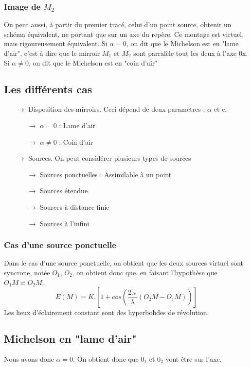 \subsubsection{Image de $M_2$}
On peut aussi, à partir du premier tracé, celui d'un point source, obtenir un schéma équivalent, ne portant que sur un axe du repère. Ce montage est virtuel, mais rigoureusement équivalent. Si $\alpha = 0$, on dit que le Michelson est en "lame d'air", c'est à dire que le mirroir $M_1$ et $M_2$ sont parralèle tout les deux à l'axe 0x. Si $\alpha \neq 0$, on dit que le Michelson est en "coin d'air"
\subsection{Les différents cas}
\begin{itemize}
 \item[$\rightarrow$] Disposition des mirroirs. Ceci dépend de deux paramètres : $\alpha$ et e.
\begin{itemize}
 \item[$\rightarrow$] $\alpha = 0$ : Lame d'air
 \item[$\rightarrow$] $\alpha \neq 0$ : Coin d'air
\end{itemize}
 \item[$\rightarrow$] Sources. On peut considérer plusieurs types de sources
\begin{itemize}
 \item[$\rightarrow$] Sources ponctuelles : Assimilable à un point
 \item[$\rightarrow$] Sources étendue
 \item[$\rightarrow$] Sources à distance finie
 \item[$\rightarrow$] Sources à l'infini
\end{itemize}
\end{itemize}
\subsubsection{Cas d'une source ponctuelle}
Dans le cas d'une source ponctuelle, on obtient que les deux sources virtuel sont syncrone, notée $O_1$, $O_2$, on obtient donc que, en faisant l'hypothèse que $O_1M \backsimeq O_2M$.\\
$$E(M) = K.[1 + cos(\dfrac{2.\pi}{\lambda}(O_2M-O_1M))]$$
Les lieux d'éclairement constant sont des hyperbolïdes de révolution.
\subsection{Michelson en "lame d'air"}
Nous avons donc $\alpha = 0$. On obtient donc que $0_1$ et $0_2$ vont être sur l'axe.
